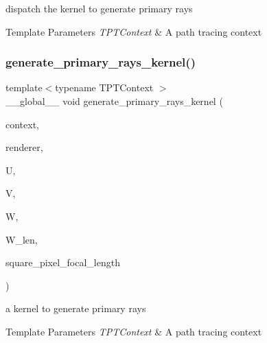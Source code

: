 dispatch the kernel to generate primary rays


\begin{DoxyTemplParams}{Template Parameters}
{\em T\+P\+T\+Context} & A path tracing context \\
\hline
\end{DoxyTemplParams}
\mbox{\label{group___p_t_lib_ga9382084c986a4fe52d55f7f225211e66}} 
\subsubsection{\texorpdfstring{generate\+\_\+primary\+\_\+rays\+\_\+kernel()}{generate\_primary\_rays\_kernel()}}
{\footnotesize\ttfamily template$<$typename T\+P\+T\+Context $>$ \\
\+\_\+\+\_\+global\+\_\+\+\_\+ void generate\+\_\+primary\+\_\+rays\+\_\+kernel (\begin{DoxyParamCaption}\item[{T\+P\+T\+Context}]{context,  }\item[{\hyperlink{struct_rendering_context_view}{Rendering\+Context\+View}}]{renderer,  }\item[{\hyperlink{structcugar_1_1_vector}{cugar\+::\+Vector3f}}]{U,  }\item[{\hyperlink{structcugar_1_1_vector}{cugar\+::\+Vector3f}}]{V,  }\item[{\hyperlink{structcugar_1_1_vector}{cugar\+::\+Vector3f}}]{W,  }\item[{const float}]{W\+\_\+len,  }\item[{const float}]{square\+\_\+pixel\+\_\+focal\+\_\+length }\end{DoxyParamCaption})}

a kernel to generate primary rays


\begin{DoxyTemplParams}{Template Parameters}
{\em T\+P\+T\+Context} & A path tracing context \\
\hline
\end{DoxyTemplParams}
\mbox{\label{group___p_t_lib_gadbd6e824e2ecdd07fae235bddebcd1d8}} 
